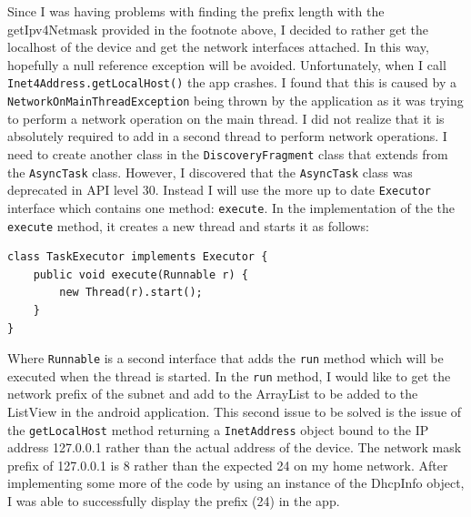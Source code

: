 \documentclass[fontsize=11pt, %
                             paper=a4, %
                             twoside, %
                             captions=tableheading,
                             index=totoc,
                             hyperref]{labbook}
\begin{document}
\begin{addmargin}[0cm]{0cm}
Since I was having problems with finding the prefix length with the getIpv4Netmask provided in the footnote above, I decided to rather get the localhost of the device and get the network interfaces attached. In this way, hopefully a null reference exception will be avoided. Unfortunately, when I call \texttt{Inet4Address.getLocalHost()} the app crashes. I found that this is caused by a \texttt{NetworkOnMainThreadException} being thrown by the application as it was trying to perform a network operation on the main thread. I did not realize that it is absolutely required to add in a second thread to perform network operations. 
\smallbreak\noindent
I need to create another class in the \texttt{DiscoveryFragment} class that extends from the \texttt{AsyncTask} class. However, I discovered that the \texttt{AsyncTask} class was deprecated in API level 30. Instead I will use the more up to date \texttt{Executor} interface which contains one method: \texttt{execute}. In the implementation of the the \texttt{execute} method, it creates a new thread and starts it as follows:
\begin{Verbatim}
class TaskExecutor implements Executor {
	public void execute(Runnable r) {
		new Thread(r).start();
	}
}
\end{Verbatim}
Where \texttt{Runnable} is a second interface that adds the \texttt{run} method which will be executed when the thread is started. In the \texttt{run} method, I would like to get the network prefix of the subnet and add to the ArrayList to be added to the ListView in the android application. 
\smallbreak\noindent
This second issue to be solved is the issue of the \texttt{getLocalHost} method returning a \texttt{InetAddress} object bound to the IP address 127.0.0.1 rather than the actual address of the device. The network mask prefix of 127.0.0.1 is 8 rather than the expected 24 on my home network. After implementing some more of the code by using an instance of the DhcpInfo object, I was able to successfully display the prefix (24) in the app.


\end{addmargin}
\end{document}

